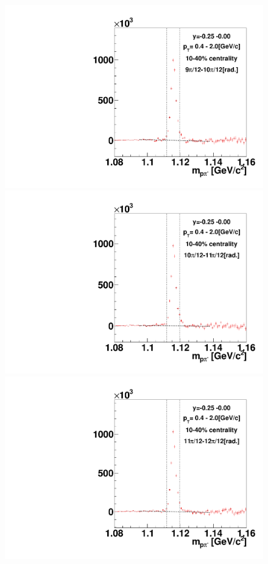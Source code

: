 \begin{figure}[h]
\includegraphics[width=0.14\linewidth]{chapterX/fig/ld_v2_sig/kf_ptslice0_cent1_ld_flow_phi10_rap2.pdf}
\includegraphics[width=0.14\linewidth]{chapterX/fig/ld_v2_sig/kf_ptslice0_cent1_ld_flow_phi11_rap2.pdf}
\includegraphics[width=0.14\linewidth]{chapterX/fig/ld_v2_sig/kf_ptslice0_cent1_ld_flow_phi12_rap2.pdf}


\end{figure}
